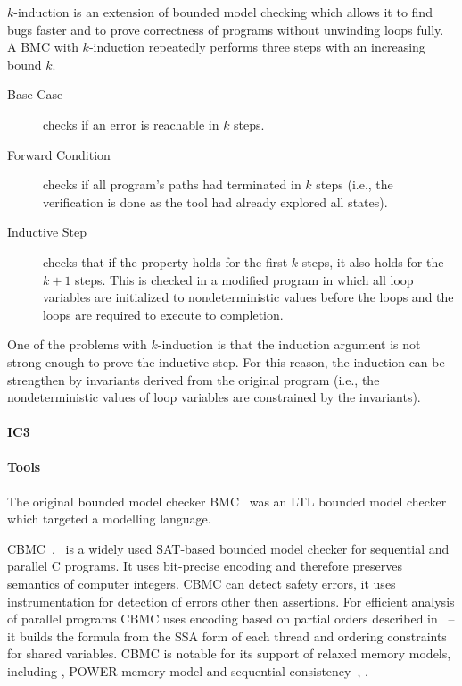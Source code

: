 $k$-induction is an extension of bounded model checking which allows it to find bugs faster and to prove correctness of programs without unwinding loops fully.
A BMC with $k$-induction repeatedly performs three steps with an increasing bound $k$.
\begin{description}
    \item[Base Case] checks if an error is reachable in $k$ steps.
    \item[Forward Condition] checks if all program's paths had terminated in
        $k$ steps (i.e., the verification is done as the tool had already
        explored all states).
    \item[Inductive Step] checks that if the property holds for the first $k$
        steps, it also holds for the $k+1$ steps.
        This is checked in a modified program in which all loop variables are
        initialized to nondeterministic values before the loops and the loops
        are required to execute to completion.
\end{description}
One of the problems with $k$-induction is that the induction argument is not strong enough to prove the inductive step.
For this reason, the induction can be strengthen by invariants derived from the original program (i.e., the nondeterministic values of loop variables are constrained by the invariants).

\paragraph{IC3} 


\paragraph{Tools}

The original bounded model checker BMC~\cite{Biere1999} was an LTL bounded
model checker which targeted a modelling language.


CBMC~\cite{Clarke2004},~\cite{Kroening2014} is a widely used SAT-based bounded
model checker for sequential and parallel C programs.
It uses bit-precise encoding and therefore preserves semantics of computer
integers.
CBMC can detect safety errors, it uses instrumentation for detection of errors
other then assertions.
For efficient analysis of parallel programs CBMC uses encoding based on partial
orders described in~\cite{Alglave2013po} -- it builds the formula from the SSA
form of each thread and ordering constraints for shared variables.
CBMC is notable for its support of relaxed memory models, including \xtso,
POWER memory model and sequential consistency~\cite{Alglave2013po}, .

